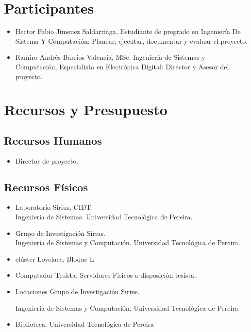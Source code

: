 \documentclass[letterpaper, 12pt, oneside]{article}
\begin{document}
    \clearpage
    
    \section{Participantes}
    \begin{itemize}
        \item Hector Fabio Jimenez Saldarriaga, Estudiante de pregrado en Ingeniería De Sistema Y Computación: Planear, ejecutar, documentar y evaluar el proyecto.
        \item Ramiro Andrés Barrios Valencia, MSc. Ingeniería de Sistemas y Computación, Especialista en Electrónica Digital: Director y Asesor del proyecto.
    \end{itemize}
    
    \section{Recursos y Presupuesto}
    \subsection{Recursos Humanos}
    \begin{itemize}
        \item Director de proyecto.
    \end{itemize}
    
    \subsection{Recursos Físicos}
    \begin{itemize}
	    \item Laboratorio Sirius, CIDT. \\
	    Ingeniería de Sistemas. Universidad Tecnológica de Pereira. 
        \item Grupo de Investigación Sirius. \\
        Ingeniería de Sistemas y Computación. Universidad Tecnológica de Pereira.
        \item clúster Lovelace, Bloque L.
        \item Computador Tesista, Servidores Físicos a disposición tesista.
        \item Locaciones Grupo de Investigación Sirius. \par Ingeniería de Sistemas y Computación. Universidad Tecnológica de Pereira
        \item Biblioteca. Universidad Tecnológica de Pereira
	\end{itemize}
	
\end{document}
